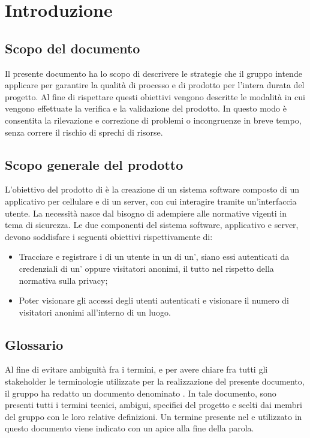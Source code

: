 \section{Introduzione}
\subsection{Scopo del documento}
Il presente documento ha lo scopo di descrivere le strategie che il gruppo \Gruppo{} intende applicare per garantire la qualità di processo e di prodotto per l’intera durata del progetto.
Al fine di rispettare questi obiettivi vengono descritte le modalità in cui vengono effettuate la verifica e la validazione del prodotto.
In questo modo è consentita la rilevazione e correzione di problemi o incongruenze in breve tempo, senza correre il rischio di sprechi di risorse.

\subsection{Scopo generale del prodotto}
L'obiettivo del prodotto \NomeProgetto{} di \Proponente{} è la creazione di un sistema software composto di un applicativo per cellulare e di un server, con cui interagire tramite un'interfaccia utente. La necessità nasce dal bisogno di adempiere alle normative vigenti in tema di sicurezza.
Le due componenti del sistema software, applicativo e server, devono soddisfare i seguenti obiettivi rispettivamente di:
\begin{itemize}
\item Tracciare e registrare i  di un utente in un  di un', siano essi autenticati da credenziali di un' oppure visitatori anonimi, il tutto nel rispetto della normativa sulla privacy;
\item Poter visionare gli accessi degli utenti autenticati e visionare il numero di visitatori anonimi all'interno di un luogo.
\end{itemize}

\subsection{Glossario}
Al fine di evitare ambiguità fra i termini, e per avere chiare fra tutti gli stakeholder le terminologie utilizzate per la realizzazione del presente documento, il gruppo \Gruppo{} ha redatto un documento denominato .
In tale documento, sono presenti tutti i termini tecnici, ambigui, specifici del progetto e scelti dai membri del gruppo con le loro relative definizioni.
Un termine presente nel  e utilizzato in questo documento viene indicato con un apice  alla fine della parola.

